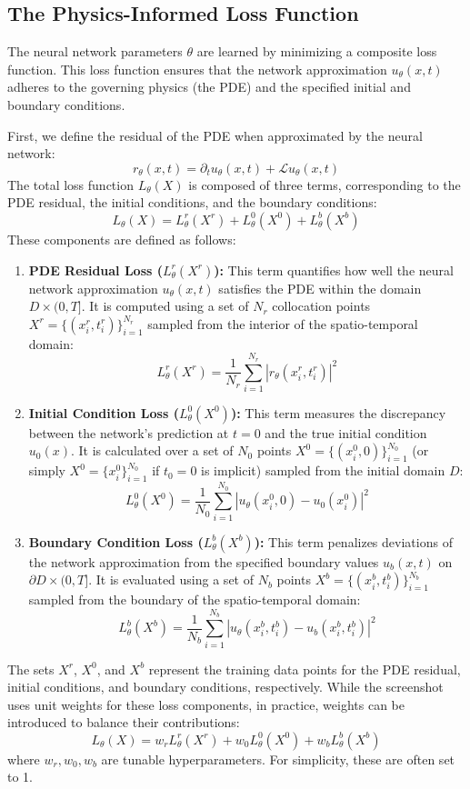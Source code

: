 \documentclass[11pt,twoside,openright]{report}
\begin{document}
\subsection{The Physics-Informed Loss Function}

The neural network parameters $\theta$ are learned by minimizing a composite loss function. This loss function ensures that the network approximation $u_{\theta}(x,t)$ adheres to the governing physics (the PDE) and the specified initial and boundary conditions.

First, we define the residual of the PDE when approximated by the neural network:
$$
r_{\theta}(x, t) = \partial_t u_{\theta}(x, t) + \mathcal{L}u_{\theta}(x, t)
$$
The total loss function $L_{\theta}(X)$ is composed of three terms, corresponding to the PDE residual, the initial conditions, and the boundary conditions:
$$
L_{\theta}(X) = L^{r}_{\theta}(X^r) + L^{0}_{\theta}(X^0) + L^{b}_{\theta}(X^b)
$$
These components are defined as follows:

\begin{enumerate}
    \item \textbf{PDE Residual Loss ($L^{r}_{\theta}(X^r)$):} This term quantifies how well the neural network approximation $u_{\theta}(x, t)$ satisfies the PDE within the domain $D \times (0, T]$. It is computed using a set of $N_r$ collocation points $X^r = \{(x_i^r, t_i^r)\}_{i=1}^{N_r}$ sampled from the interior of the spatio-temporal domain:
    $$
    L^{r}_{\theta}(X^r) = \frac{1}{N_r} \sum_{i=1}^{N_r} |r_{\theta}(x_i^r, t_i^r)|^2
    $$

    \item \textbf{Initial Condition Loss ($L^{0}_{\theta}(X^0)$):} This term measures the discrepancy between the network's prediction at $t=0$ and the true initial condition $u_0(x)$. It is calculated over a set of $N_0$ points $X^0 = \{(x_i^0, 0)\}_{i=1}^{N_0}$ (or simply $X^0 = \{x_i^0\}_{i=1}^{N_0}$ if $t_0=0$ is implicit) sampled from the initial domain $D$:
    $$
    L^{0}_{\theta}(X^0) = \frac{1}{N_0} \sum_{i=1}^{N_0} |u_{\theta}(x_i^0, 0) - u_0(x_i^0)|^2
    $$

    \item \textbf{Boundary Condition Loss ($L^{b}_{\theta}(X^b)$):} This term penalizes deviations of the network approximation from the specified boundary values $u_b(x, t)$ on $\partial D \times (0, T]$. It is evaluated using a set of $N_b$ points $X^b = \{(x_i^b, t_i^b)\}_{i=1}^{N_b}$ sampled from the boundary of the spatio-temporal domain:
    $$
    L^{b}_{\theta}(X^b) = \frac{1}{N_b} \sum_{i=1}^{N_b} |u_{\theta}(x_i^b, t_i^b) - u_b(x_i^b, t_i^b)|^2
    $$
\end{enumerate}
The sets $X^r$, $X^0$, and $X^b$ represent the training data points for the PDE residual, initial conditions, and boundary conditions, respectively. While the screenshot uses unit weights for these loss components, in practice, weights can be introduced to balance their contributions:
$$
L_{\theta}(X) = w_r L^{r}_{\theta}(X^r) + w_0 L^{0}_{\theta}(X^0) + w_b L^{b}_{\theta}(X^b)
$$
where $w_r, w_0, w_b$ are tunable hyperparameters. For simplicity, these are often set to 1.
\end{document}
